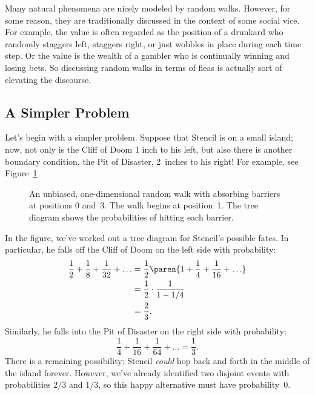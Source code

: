 Many natural phenomena are nicely modeled by random walks.  However,
for some reason, they are traditionally discussed in the context of
some social vice.  For example, the value is often regarded as the
position of a drunkard who randomly staggers left, staggers right, or
just wobbles in place during each time step.  Or the value is the
wealth of a gambler who is continually winning and losing bets.  So
discussing random walks in terms of fleas is actually sort of
elevating the discourse.

\subsection{A Simpler Problem}

Let's begin with a simpler problem.  Suppose that Stencil is on a
small island; now, not only is the Cliff of Doom 1 inch to his left,
but also there is another boundary condition, the Pit of Disaster,
2~inches to his right!  For example, see Figure~\ref{fig:19P1}

\begin{figure}



\caption{An unbiased, one-dimensional random walk with absorbing
  barriers at positions 0 and~3.  The walk begins at position~1.  The
  tree diagram shows the probabilities of hitting each barrier.}

\label{fig:19P1}

\end{figure}

In the figure, we've worked out a tree diagram for Stencil's possible
fates.  In particular, he falls off the Cliff of Doom on the left side
with probability:
%
\begin{align*}
\frac{1}{2} + \frac{1}{8} + \frac{1}{32} + \ldots
    & = \frac{1}{2} \paren{1 + \frac{1}{4} + \frac{1}{16} + \ldots} \\
    & = \frac{1}{2} \cdot \frac{1}{1 - 1/4} \\
    & = \frac{2}{3}.
\end{align*}
%
Similarly, he falls into the Pit of Disaster on the right side with
probability:
%
\[
\frac{1}{4} + \frac{1}{16} + \frac{1}{64} + \ldots = \frac{1}{3}.
\]
%
There is a remaining possibility: Stencil \emph{could} hop back and
forth in the middle of the island forever.  However, we've already
identified two disjoint events with probabilities $2/3$ and $1/3$, so
this happy alternative must have probability~0.

